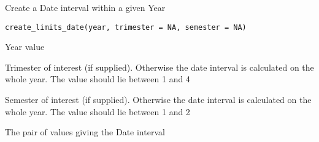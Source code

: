 %
\begin{Description}\relax
Create a Date interval within a given Year
\end{Description}
%
\begin{Usage}
\begin{verbatim}
create_limits_date(year, trimester = NA, semester = NA)
\end{verbatim}
\end{Usage}
%
\begin{Arguments}
\begin{ldescription}
\item[\code{year}] 
Year value

\item[\code{trimester}] 
Trimester of interest (if supplied). Otherwise the date interval is
calculated on the whole year. The value should lie between 1 and 4

\item[\code{semester}] 
Semester of interest (if supplied). Otherwise the date interval is
calculated on the whole year. The value should lie between 1 and 2

\end{ldescription}
\end{Arguments}
%
\begin{Value}
The pair of values giving the Date interval
\end{Value}
